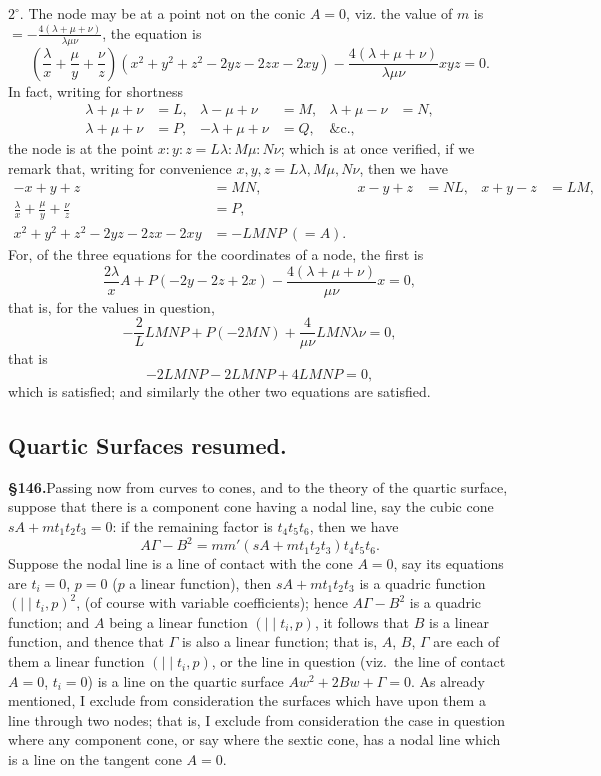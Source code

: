 \documentclass[11pt,a4paper]{article}
\begin{document}
$2^{\circ}$. The node may be at a point not on the conic $A = 0$, viz. the value of $m$ is $= -\frac{4(\lambda + \mu + \nu)}{\lambda\mu\nu}$, the equation is
\[
\left(\frac{\lambda}{x} + \frac{\mu}{y} + \frac{\nu}{z}\right)(x^2 + y^2 + z^2 - 2yz - 2zx - 2xy) - \frac{4(\lambda + \mu + \nu)}{\lambda\mu\nu}xyz = 0.
\]
In fact, writing for shortness
\begin{align*}
\lambda + \mu + \nu &= L, & \lambda - \mu + \nu &= M, & \lambda + \mu - \nu &= N, \\
\lambda + \mu + \nu &= P, & -\lambda + \mu + \nu &= Q, & \&\text{c.},
\end{align*}
the node is at the point $x : y : z = L\lambda : M\mu : N\nu$; which is at once verified, if we remark that, writing for convenience $x, y, z = L\lambda, M\mu, N\nu$, then we have
\begin{align*}
-x + y + z &= MN, & x - y + z &= NL, & x + y - z &= LM, \\
\frac{\lambda}{x} + \frac{\mu}{y} + \frac{\nu}{z} &= P, \\
x^2 + y^2 + z^2 - 2yz - 2zx - 2xy &= -LMNP\ (= A).
\end{align*}
For, of the three equations for the coordinates of a node, the first is
\[
\frac{2\lambda}{x}A + P(-2y - 2z + 2x) - \frac{4(\lambda + \mu + \nu)}{\mu\nu}x = 0,
\]
that is, for the values in question,
\[
-\frac{2}{L}LMNP + P(-2MN) + \frac{4}{\mu\nu}LMN\lambda\nu = 0,
\]
that is
\[
-2LMNP - 2LMNP + 4LMNP = 0,
\]
which is satisfied; and similarly the other two equations are satisfied.

\subsection*{Quartic Surfaces resumed.}

\textbf{\S 146.}\quad Passing now from curves to cones, and to the theory of the quartic surface, suppose that there is a component cone having a nodal line, say the cubic cone $sA + mt_1t_2t_3 = 0$: if the remaining factor is $t_4t_5t_6$, then we have
\[
A\Gamma - B^2 = mm'(sA + mt_1t_2t_3)t_4t_5t_6.
\]
Suppose the nodal line is a line of contact with the cone $A = 0$, say its equations are $t_i = 0$, $p = 0$ ($p$ a linear function), then $sA + mt_1t_2t_3$ is a quadric function $(\mid\mid t_i, p)^2$, (of course with variable coefficients); hence $A\Gamma - B^2$ is a quadric function; and $A$ being a linear function $(\mid\mid t_i, p)$, it follows that $B$ is a linear function, and thence that $\Gamma$ is also a linear function; that is, $A$, $B$, $\Gamma$ are each of them a linear function $(\mid\mid t_i, p)$, or the line in question (viz.\ the line of contact $A = 0$, $t_i = 0$) is a line on the quartic surface $Aw^2 + 2Bw + \Gamma = 0$. As already mentioned, I exclude from consideration the surfaces which have upon them a line through two nodes; that is, I exclude from consideration the case in question where any component cone, or say where the sextic cone, has a nodal line which is a line on the tangent cone $A = 0$.
\end{document}
